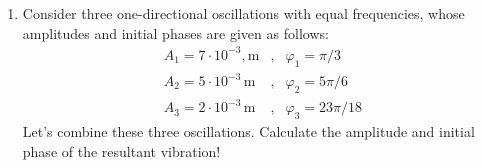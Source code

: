 \documentclass[t,aspectratio=169]{beamer}
\begin{document}
\begin{frame}
\begin{enumerate}
\begin{enumerate}
\begin{columns}
\begin{column}{0.4\linewidth}
\begin{center}
\end{center}
\end{column}
\begin{column}{0.7\linewidth}
Calculating the phase difference:
$x\left(t\right) = 3 \cdot \sin\left(\omega t\right) + 4 \cdot \cos\left(\omega t\right) = 3 \cdot \sin\left(\omega t\right) + 4 \cdot \sin\left(\omega t + \frac{\pi}{2} \right)$
$\cos\left(\alpha\right) =\sin\left(\alpha + \frac{\pi}{2}\right)$

The phase difference: $\varphi_{1} = \omega t$, $\varphi_{2} = \omega t + \frac{\pi}{2}$.
$$  \varphi_{1} - \varphi_{2} = -\frac{\pi}{2}$$
$A = \sqrt{A^{2}_{1} + A^{2}_{2} + 2 \cdot A_{1} \cdot A_{2} \cdot \cos\left(\varphi_{1} - \varphi_{2}\right)}=\sqrt{3^2+4^2+2\cdot 3\cdot 4 \cos\left(-\frac{\pi}{2}\right)}$

Therefore, the amplitude is A = 5.
\end{column}
\end{columns}

\end{enumerate}

\pagebreak

\item Consider three one-directional oscillations with equal frequencies, whose amplitudes and initial phases are given as follows:
\begin{eqnarray*}
A_1 = 7 \cdot 10^{-3},\mathrm{m}&,& \varphi_1 = \pi/3 \\
A_2 = 5 \cdot 10^{-3}\,\mathrm{m}&,& \varphi_2 = 5\pi/6 \\
A_3 = 2 \cdot 10^{-3}\,\mathrm{m}&,& \varphi_3 = 23\pi/18
\end{eqnarray*}
Let’s combine these three oscillations. Calculate the amplitude and initial phase of the resultant vibration!


\end{enumerate}
\end{frame}
\end{document}
